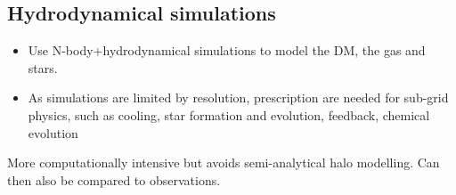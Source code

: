 \subsection{Hydrodynamical simulations}
\begin{itemize}
	\item Use N-body+hydrodynamical simulations to model the DM, the gas and stars.
	\item As simulations are limited by resolution, prescription are needed for sub-grid physics, such as cooling, star formation and evolution, feedback, chemical evolution
\end{itemize}
More computationally intensive but avoids semi-analytical halo modelling.
Can then also be compared to observations.